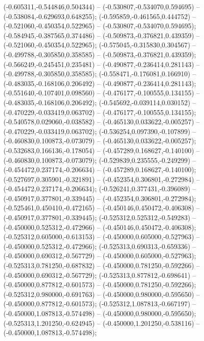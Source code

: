  (-0.605311,-0.544846,0.504344) -- (-0.530807,-0.534070,0.594695) -- (-0.538084,-0.629693,0.648255);
 (-0.595859,-0.461565,0.444752) -- (-0.521060,-0.450354,0.522965) -- (-0.530807,-0.534070,0.594695);
 (-0.584945,-0.387565,0.374486) -- (-0.509873,-0.376821,0.439359) -- (-0.521060,-0.450354,0.522965);
 (-0.575045,-0.315830,0.304567) -- (-0.499788,-0.305850,0.358585) -- (-0.509873,-0.376821,0.439359);
 (-0.566249,-0.245451,0.235481) -- (-0.490877,-0.236414,0.281143) -- (-0.499788,-0.305850,0.358585);
 (-0.558471,-0.176081,0.166910) -- (-0.483035,-0.168106,0.206492) -- (-0.490877,-0.236414,0.281143);
 (-0.551640,-0.107401,0.098560) -- (-0.476177,-0.100555,0.134155) -- (-0.483035,-0.168106,0.206492);
 (-0.545692,-0.039114,0.030152) -- (-0.470229,-0.033419,0.063702) -- (-0.476177,-0.100555,0.134155);
 (-0.540578,0.029060,-0.038582) -- (-0.465130,0.033622,-0.005257) -- (-0.470229,-0.033419,0.063702);
 (-0.536254,0.097390,-0.107899) -- (-0.460830,0.100873,-0.073079) -- (-0.465130,0.033622,-0.005257);
 (-0.532683,0.166136,-0.178054) -- (-0.457289,0.168627,-0.140100) -- (-0.460830,0.100873,-0.073079);
 (-0.529839,0.235555,-0.249299) -- (-0.454472,0.237174,-0.206634) -- (-0.457289,0.168627,-0.140100);
 (-0.527697,0.305901,-0.321891) -- (-0.452354,0.306801,-0.272984) -- (-0.454472,0.237174,-0.206634);
 (-0.526241,0.377431,-0.396089) -- (-0.450917,0.377801,-0.339445) -- (-0.452354,0.306801,-0.272984);
 (-0.525461,0.450410,-0.472165) -- (-0.450146,0.450472,-0.406308) -- (-0.450917,0.377801,-0.339445);
 (-0.525312,0.525312,-0.549283) -- (-0.450000,0.525312,-0.472966) -- (-0.450146,0.450472,-0.406308);
 (-0.525312,0.605000,-0.613153) -- (-0.450000,0.605000,-0.527963) -- (-0.450000,0.525312,-0.472966);
 (-0.525313,0.690313,-0.659336) -- (-0.450000,0.690312,-0.567729) -- (-0.450000,0.605000,-0.527963);
 (-0.525313,0.781250,-0.687832) -- (-0.450000,0.781250,-0.592266) -- (-0.450000,0.690312,-0.567729);
 (-0.525313,0.877812,-0.698641) -- (-0.450000,0.877812,-0.601573) -- (-0.450000,0.781250,-0.592266);
 (-0.525312,0.980000,-0.691763) -- (-0.450000,0.980000,-0.595650) -- (-0.450000,0.877812,-0.601573);
 (-0.525312,1.087813,-0.667197) -- (-0.450000,1.087813,-0.574498) -- (-0.450000,0.980000,-0.595650);
 (-0.525313,1.201250,-0.624945) -- (-0.450000,1.201250,-0.538116) -- (-0.450000,1.087813,-0.574498);
